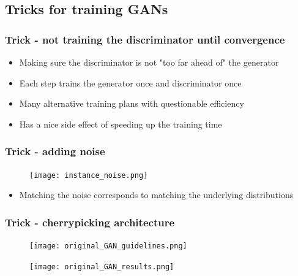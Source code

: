 \documentclass{Bredelebeamer}
\begin{document}
\subsection{Tricks for training GANs}
\begin{frame}
	\frametitle{Trick - not training the discriminator until convergence}
	\begin{itemize}[<+->]
		\item Making sure the discriminator is not "too far ahead of" the generator
		\item Each step trains the generator once and discriminator once
		\item Many alternative training plans with questionable efficiency
		\item Has a nice side effect of speeding up the training time
	\end{itemize}
\end{frame}
\begin{frame}
	\frametitle{Trick - adding noise}
	\begin{figure}[h!]
		\centering
		\texttt{[image: instance\_noise.png]}
	\end{figure}
	\begin{itemize}
		\item Matching the noise corresponds to matching the underlying distributions
	\end{itemize}
\end{frame}
\begin{frame}
	\frametitle{Trick - cherrypicking architecture}
		\begin{figure}[h!]
			\centering
			\texttt{[image: original\_GAN\_guidelines.png]}
		\end{figure}
		\pause
		\begin{figure}[h!]
			\centering
			\texttt{[image: original\_GAN\_results.png]}
		\end{figure}
\end{frame}
\end{document}
